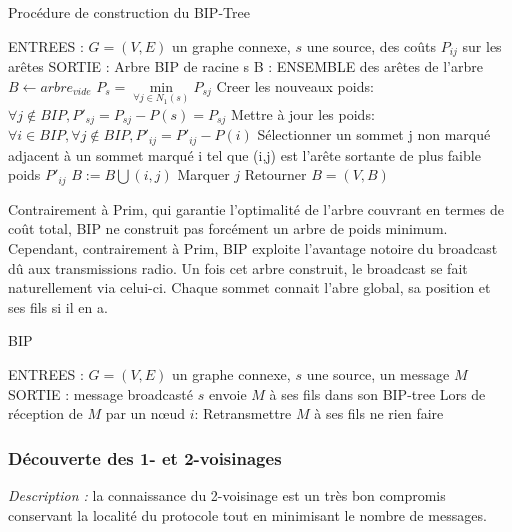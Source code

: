 \begin{algorithm}[H]
\caption{Procédure de construction du BIP-Tree}
\label{algo_BIP_tree}
\begin{algorithmic}
\STATE ENTREES :  $G=(V,E)$ un graphe connexe, $s$ une source, des coûts $P_{ij}$ sur les arêtes 
\STATE SORTIE : Arbre BIP de racine s
\STATE B : ENSEMBLE des arêtes de l'arbre
\STATE  $B \leftarrow arbre_{vide}$
\STATE $P_s = \min \limits_{\forall j \in N_1(s)}{P_{sj}}$
\STATE Creer les nouveaux poids: $\forall j \notin BIP, P'_{sj}=P_{sj}-P(s)=P_{sj}$
   \STATE Mettre à jour les poids:  $ \forall i \in BIP, \forall j \notin BIP, P'_{ij}=P'_{ij}-P(i)$
   \STATE Sélectionner un sommet j non marqué adjacent à un sommet marqué i tel que (i,j) est l'arête sortante de plus faible poids $P'_{ij}$
   \STATE $B := B\bigcup   {(i,j)}$
   \STATE Marquer $j$
\ENDWHILE
\STATE Retourner $B=(V,B)$
\end{algorithmic}
\end{algorithm}

Contrairement à Prim, qui garantie l'optimalité de l'arbre couvrant en termes de coût total,
BIP ne construit pas forcément un arbre de poids minimum. Cependant, contrairement à Prim, 
BIP exploite l'avantage notoire du broadcast dû aux transmissions radio. Un fois cet arbre 
construit, le broadcast se fait naturellement via celui-ci. Chaque sommet connait l'abre global,
sa position et ses fils si il en a.



\begin{algorithm}[H]
\caption{BIP}
\label{algo_BIP}
\begin{algorithmic}
\STATE ENTREES :  $G=(V,E)$ un graphe connexe, $s$ une source, un message $M$
\STATE SORTIE : message broadcasté
\STATE $s$ envoie $M$ à ses fils dans son BIP-tree
\STATE Lors de réception de $M$ par un nœud $i$:
	\STATE Retransmettre $M$ à ses fils
\ELSE
	\STATE ne rien faire
\ENDIF
\end{algorithmic}
\end{algorithm}

\subsubsection{Découverte des 1- et 2-voisinages}
\emph{Description :} la connaissance du 2-voisinage est un très bon compromis conservant la localité du protocole tout en minimisant le nombre de messages.

